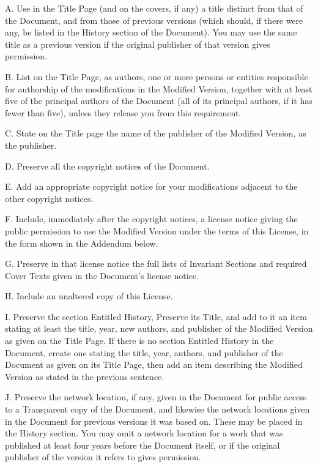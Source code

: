 \begin{noIndex}
A. Use in the Title Page (and on the covers, if any) a title distinct
from that of the Document, and from those of previous versions (which
should, if there were any, be listed in the History section of the
Document). You may use the same title as a previous version if the
original publisher of that version gives permission.

B. List on the Title Page, as authors, one or more persons or entities
responsible for authorship of the modifications in the Modified
Version, together with at least five of the principal authors of the
Document (all of its principal authors, if it has fewer than five),
unless they release you from this requirement.

C. State on the Title page the name of the publisher of the Modified
Version, as the publisher.

D. Preserve all the copyright notices of the Document. 

E. Add an appropriate copyright notice for your modifications adjacent
to the other copyright notices.

F. Include, immediately after the copyright notices, a license notice
giving the public permission to use the Modified Version under the
terms of this License, in the form shown in the Addendum below.

G. Preserve in that license notice the full lists of Invariant
Sections and required Cover Texts given in the Document's license
notice.

H. Include an unaltered copy of this License. 

I. Preserve the section Entitled
{\textquotedbl}History{\textquotedbl}, Preserve its Title, and add to
it an item stating at least the title, year, new authors, and
publisher of the Modified Version as given on the Title Page. If there
is no section Entitled {\textquotedbl}History{\textquotedbl} in the
Document, create one stating the title, year, authors, and publisher
of the Document as given on its Title Page, then add an item
describing the Modified Version as stated in the previous sentence.

J. Preserve the network location, if any, given in the Document for
public access to a Transparent copy of the Document, and likewise the
network locations given in the Document for previous versions it was
based on. These may be placed in the
{\textquotedbl}History{\textquotedbl} section. You may omit a network
location for a work that was published at least four years before the
Document itself, or if the original publisher of the version it refers
to gives permission.


\end{noIndex}
